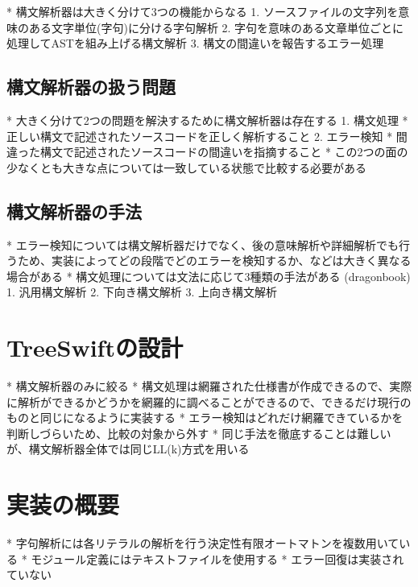 * 構文解析器は大きく分けて3つの機能からなる
    1. ソースファイルの文字列を意味のある文字単位(字句)に分ける字句解析
    2. 字句を意味のある文章単位ごとに処理してASTを組み上げる構文解析
    3. 構文の間違いを報告するエラー処理

\subsection{構文解析器の扱う問題}

* 大きく分けて2つの問題を解決するために構文解析器は存在する
    1. 構文処理
        * 正しい構文で記述されたソースコードを正しく解析すること
    2. エラー検知
        * 間違った構文で記述されたソースコードの間違いを指摘すること
* この2つの面の少なくとも大きな点については一致している状態で比較する必要がある

\subsection{構文解析器の手法}

* エラー検知については構文解析器だけでなく、後の意味解析や詳細解析でも行うため、実装によってどの段階でどのエラーを検知するか、などは大きく異なる場合がある
* 構文処理については文法に応じて3種類の手法がある (dragonbook)
    1. 汎用構文解析
    2. 下向き構文解析
    3. 上向き構文解析


\section{TreeSwiftの設計}

* 構文解析器のみに絞る
* 構文処理は網羅された仕様書が作成できるので、実際に解析ができるかどうかを網羅的に調べることができるので、できるだけ現行のものと同じになるように実装する
* エラー検知はどれだけ網羅できているかを判断しづらいため、比較の対象から外す
* 同じ手法を徹底することは難しいが、構文解析器全体では同じLL(k)方式を用いる


\section{実装の概要}

* 字句解析には各リテラルの解析を行う決定性有限オートマトンを複数用いている
* モジュール定義にはテキストファイルを使用する
* エラー回復は実装されていない



